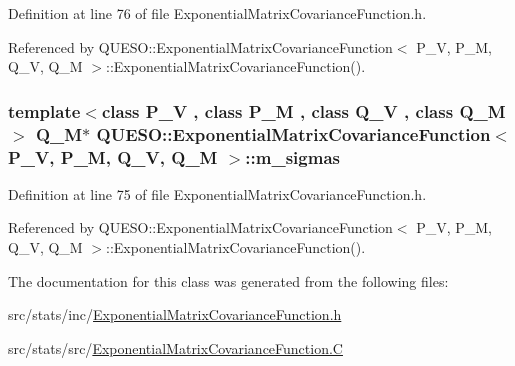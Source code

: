 Definition at line 76 of file Exponential\-Matrix\-Covariance\-Function.\-h.



Referenced by Q\-U\-E\-S\-O\-::\-Exponential\-Matrix\-Covariance\-Function$<$ P\-\_\-\-V, P\-\_\-\-M, Q\-\_\-\-V, Q\-\_\-\-M $>$\-::\-Exponential\-Matrix\-Covariance\-Function().

\hypertarget{class_q_u_e_s_o_1_1_exponential_matrix_covariance_function_a4da6af8ffd336294a3d7a89c5258099e}{
\subsubsection[{m\-\_\-sigmas}]{\setlength{\rightskip}{0pt plus 5cm}template$<$class P\-\_\-\-V , class P\-\_\-\-M , class Q\-\_\-\-V , class Q\-\_\-\-M $>$ Q\-\_\-\-M$\ast$ {\bf Q\-U\-E\-S\-O\-::\-Exponential\-Matrix\-Covariance\-Function}$<$ P\-\_\-\-V, P\-\_\-\-M, Q\-\_\-\-V, Q\-\_\-\-M $>$\-::m\-\_\-sigmas\hspace{0.3cm}{\ttfamily [protected]}}}\label{class_q_u_e_s_o_1_1_exponential_matrix_covariance_function_a4da6af8ffd336294a3d7a89c5258099e}


Definition at line 75 of file Exponential\-Matrix\-Covariance\-Function.\-h.



Referenced by Q\-U\-E\-S\-O\-::\-Exponential\-Matrix\-Covariance\-Function$<$ P\-\_\-\-V, P\-\_\-\-M, Q\-\_\-\-V, Q\-\_\-\-M $>$\-::\-Exponential\-Matrix\-Covariance\-Function().



The documentation for this class was generated from the following files\-:\begin{DoxyCompactItemize}
\item 
src/stats/inc/\hyperlink{_exponential_matrix_covariance_function_8h}{Exponential\-Matrix\-Covariance\-Function.\-h}\item 
src/stats/src/\hyperlink{_exponential_matrix_covariance_function_8_c}{Exponential\-Matrix\-Covariance\-Function.\-C}\end{DoxyCompactItemize}
